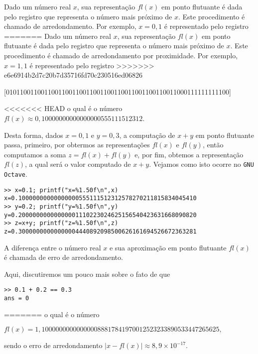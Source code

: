 Dado um número real $x$, sua representação $fl(x)$ em ponto flutuante é dada pelo registro que representa o número mais próximo de $x$. Este procedimento é chamado de arredondamento. Por exemplo, $x = 0,1$ é representado pelo registro
=======
Dado um número real $x$, sua representação $fl(x)$ em ponto flutuante é dada pelo registro que representa o número mais próximo de $x$. Este procedimento é chamado de arredondamento por proximidade. Por exemplo, $x = 1,1$ é representado pelo registro
>>>>>>> e6e6914b2d7c20b7d35716fd70c230516ed06826
\begin{small}
  \begin{center}
    [0101100110011001100110011001100110011001100110011000111111111100]
  \end{center}
\end{small}
<<<<<<< HEAD
o qual é o número $fl(x) \approx 0,10000000000000000555111512312$. 

Desta forma, dados $x=0,1$ e $y=0,3$, a computação de $x + y$ em ponto flutuante passa, primeiro, por obtermos as representações $fl(x)$ e $fl(y)$, então computamos a soma $z = fl(x)+fl(y)$ e, por fim, obtemos a representação $fl(z)$, a qual será o valor computado de $x + y$.
\ifisoctave
Vejamos como isto ocorre no \verb+GNU Octave+.
\begin{verbatim}
>> x=0.1; printf("x=%1.50f\n",x)
x=0.10000000000000000555111512312578270211815834045410
>> y=0.2; printf("y=%1.50f\n",y)
y=0.20000000000000001110223024625156540423631668090820
>> z=x+y; printf("z=%1.50f\n",z)
z=0.30000000000000004440892098500626161694526672363281
\end{verbatim}
\fi

A diferença entre o número real $x$ e sua aproximação em ponto flutuante $fl(x)$ é chamada de erro de arredondamento.


Aqui, discutiremos um pouco mais sobre o fato de que
\ifisoctave
\begin{verbatim}
>> 0.1 + 0.2 == 0.3
ans = 0
\end{verbatim}
\fi


=======
o qual é o número 
\begin{small}
  \begin{center}
    $fl(x) = 1,100000000000000088817841970012523233890533447265625,$
  \end{center}
\end{small}
sendo o erro de arredondamento $|x - fl(x)| \approx 8,9\times 10^{-17}$.

